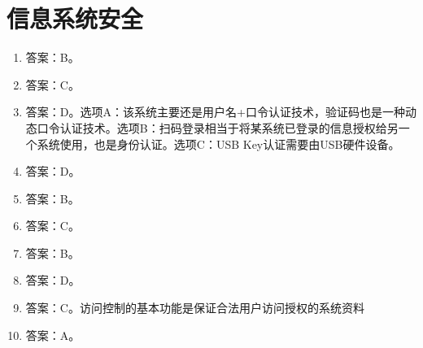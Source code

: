 \section{信息系统安全}

\begin{enumerate}
\item 答案：B。

\item 答案：C。

\item 答案：D。选项A：该系统主要还是用户名+口令认证技术，验证码也是一种动态口令认证技术。选项B：扫码登录相当于将某系统已登录的信息授权给另一个系统使用，也是身份认证。选项C：USB Key认证需要由USB硬件设备。

\item 答案：D。

\item 答案：B。

\item 答案：C。

\item 答案：B。

\item 答案：D。

\item 答案：C。访问控制的基本功能是保证合法用户访问授权的系统资料

\item 答案：A。


\end{enumerate}
